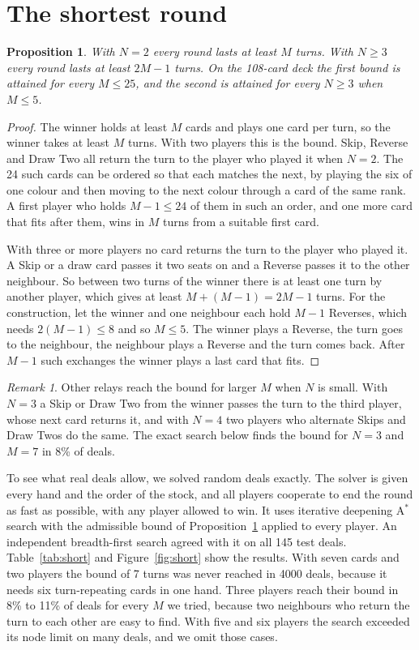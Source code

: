 \documentclass[11pt]{amsart}
\newtheorem{proposition}[theorem]{Proposition}
\theoremstyle{remark}
\newtheorem{remark}[theorem]{Remark}
\begin{document}
\section{The shortest round}\label{sec:short}

\begin{proposition}\label{prop:short}
With $N=2$ every round lasts at least $M$ turns. With $N\ge 3$ every round lasts at least $2M-1$ turns. On the 108-card deck the first bound is attained for every $M\le 25$, and the second is attained for every $N\ge3$ when $M\le5$.
\end{proposition}

\begin{proof}
The winner holds at least $M$ cards and plays one card per turn, so the winner takes at least $M$ turns. With two players this is the bound. Skip, Reverse and Draw Two all return the turn to the player who played it when $N=2$. The 24 such cards can be ordered so that each matches the next, by playing the six of one colour and then moving to the next colour through a card of the same rank. A first player who holds $M-1\le24$ of them in such an order, and one more card that fits after them, wins in $M$ turns from a suitable first card.

With three or more players no card returns the turn to the player who played it. A Skip or a draw card passes it two seats on and a Reverse passes it to the other neighbour. So between two turns of the winner there is at least one turn by another player, which gives at least $M+(M-1)=2M-1$ turns. For the construction, let the winner and one neighbour each hold $M-1$ Reverses, which needs $2(M-1)\le 8$ and so $M\le5$. The winner plays a Reverse, the turn goes to the neighbour, the neighbour plays a Reverse and the turn comes back. After $M-1$ such exchanges the winner plays a last card that fits.
\end{proof}

\begin{remark}
Other relays reach the bound for larger $M$ when $N$ is small. With $N=3$ a Skip or Draw Two from the winner passes the turn to the third player, whose next card returns it, and with $N=4$ two players who alternate Skips and Draw Twos do the same. The exact search below finds the bound for $N=3$ and $M=7$ in 8\% of deals.
\end{remark}

To see what real deals allow, we solved random deals exactly. The solver is given every hand and the order of the stock, and all players cooperate to end the round as fast as possible, with any player allowed to win. It uses iterative deepening A$^*$ search with the admissible bound of Proposition~\ref{prop:short} applied to every player. An independent breadth-first search agreed with it on all 145 test deals. Table~\ref{tab:short} and Figure~\ref{fig:short} show the results. With seven cards and two players the bound of 7 turns was never reached in 4000 deals, because it needs six turn-repeating cards in one hand. Three players reach their bound in 8\% to 11\% of deals for every $M$ we tried, because two neighbours who return the turn to each other are easy to find. With five and six players the search exceeded its node limit on many deals, and we omit those cases.
\end{document}
